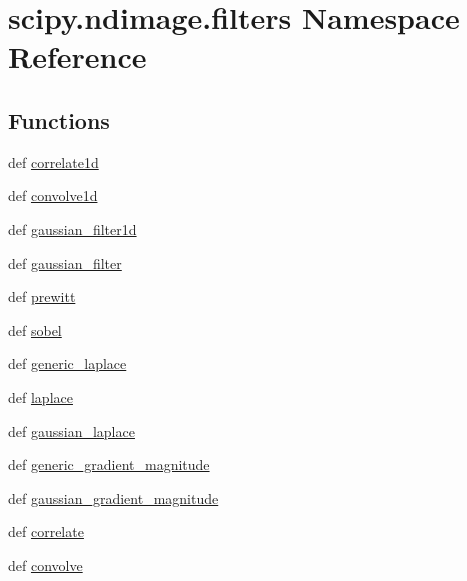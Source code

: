 \hypertarget{namespacescipy_1_1ndimage_1_1filters}{}\section{scipy.\+ndimage.\+filters Namespace Reference}
\label{namespacescipy_1_1ndimage_1_1filters}
\subsection*{Functions}
\begin{DoxyCompactItemize}
\item 
def \hyperlink{namespacescipy_1_1ndimage_1_1filters_ae6a97ccd7ed628b671ee3aede1331265}{correlate1d}
\item 
def \hyperlink{namespacescipy_1_1ndimage_1_1filters_a87f7e83ed0e1dd68c06ed41eb3c338d0}{convolve1d}
\item 
def \hyperlink{namespacescipy_1_1ndimage_1_1filters_a2b4bc11312b6f58d40461c2024b76485}{gaussian\+\_\+filter1d}
\item 
def \hyperlink{namespacescipy_1_1ndimage_1_1filters_a2adedca7484e79c401ea717099322e1f}{gaussian\+\_\+filter}
\item 
def \hyperlink{namespacescipy_1_1ndimage_1_1filters_ae15e6044c4fefd85b02dabf33b80e90c}{prewitt}
\item 
def \hyperlink{namespacescipy_1_1ndimage_1_1filters_a94e0277fe539ca0db1570ac913464eb7}{sobel}
\item 
def \hyperlink{namespacescipy_1_1ndimage_1_1filters_afedfe737d1116b84bb30212dd970ddb8}{generic\+\_\+laplace}
\item 
def \hyperlink{namespacescipy_1_1ndimage_1_1filters_a246d69906300665164007e0ca7610732}{laplace}
\item 
def \hyperlink{namespacescipy_1_1ndimage_1_1filters_a52c43e3c39a7c44a8e18a43b178d6872}{gaussian\+\_\+laplace}
\item 
def \hyperlink{namespacescipy_1_1ndimage_1_1filters_af6a275b51d5af87ec7c762eb7a236ad6}{generic\+\_\+gradient\+\_\+magnitude}
\item 
def \hyperlink{namespacescipy_1_1ndimage_1_1filters_a87bfd340cca6f06cc39ac4dbbd8a1e4a}{gaussian\+\_\+gradient\+\_\+magnitude}
\item 
def \hyperlink{namespacescipy_1_1ndimage_1_1filters_aa511809209d5cfa69fe0748aea34db92}{correlate}
\item 
def \hyperlink{namespacescipy_1_1ndimage_1_1filters_a5180359cf93d56193436f59978e36036}{convolve}

\end{DoxyCompactItemize}
